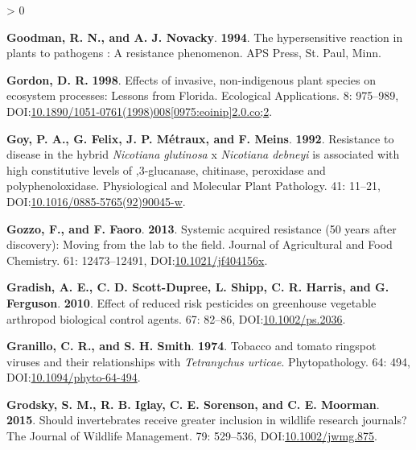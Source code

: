 \documentclass{ufdissertation}[overrideChapters] %
\newlength{\cslhangindent}
\newenvironment{CSLReferences}[2] %
 {%
  \setlength{\parindent}{0pt}
  \ifodd #1 \everypar{\setlength{\hangindent}{\cslhangindent}}\ignorespaces\fi
  \ifnum #2 > 0
  \setlength{\parskip}{#2\baselineskip}
  \fi
 }%
 {}
\begin{document}
{\begin{CSLReferences}{1}{1}
\leavevmode{}%
\textbf{Goodman, R. N., and A. J. Novacky}. \textbf{1994}. The hypersensitive reaction in plants to pathogens : A resistance phenomenon. APS Press, St. Paul, Minn.

\leavevmode{}%
\textbf{Gordon, D. R.} \textbf{1998}. Effects of invasive, non-indigenous plant species on ecosystem processes: Lessons from {Florida}. Ecological Applications. 8: 975--989, DOI:\href{https://doi.org/10.1890/1051-0761(1998)008\%5B0975:eoinip\%5D2.0.co;2}{10.1890/1051-0761(1998)008{[}0975:eoinip{]}2.0.co;2}.

\leavevmode{}%
\textbf{Goy, P. A., G. Felix, J. P. Métraux, and F. Meins}. \textbf{1992}. Resistance to disease in the hybrid {\emph{Nicotiana glutinosa}} x {\emph{Nicotiana debneyi}} is associated with high constitutive levels of ,3-glucanase, chitinase, peroxidase and polyphenoloxidase. Physiological and Molecular Plant Pathology. 41: 11--21, DOI:\href{https://doi.org/10.1016/0885-5765(92)90045-w}{10.1016/0885-5765(92)90045-w}.

\leavevmode{}%
\textbf{Gozzo, F., and F. Faoro}. \textbf{2013}. Systemic acquired resistance (50 years after discovery): Moving from the lab to the field. Journal of Agricultural and Food Chemistry. 61: 12473--12491, DOI:\href{https://doi.org/10.1021/jf404156x}{10.1021/jf404156x}.

\leavevmode{}%
\textbf{Gradish, A. E., C. D. Scott-Dupree, L. Shipp, C. R. Harris, and G. Ferguson}. \textbf{2010}. Effect of reduced risk pesticides on greenhouse vegetable arthropod biological control agents. 67: 82--86, DOI:\href{https://doi.org/10.1002/ps.2036}{10.1002/ps.2036}.

\leavevmode{}%
\textbf{Granillo, C. R., and S. H. Smith}. \textbf{1974}. Tobacco and tomato ringspot viruses and their relationships with {\emph{Tetranychus urticae}}. Phytopathology. 64: 494, DOI:\href{https://doi.org/10.1094/phyto-64-494}{10.1094/phyto-64-494}.

\leavevmode{}%
\textbf{Grodsky, S. M., R. B. Iglay, C. E. Sorenson, and C. E. Moorman}. \textbf{2015}. Should invertebrates receive greater inclusion in wildlife research journals? The Journal of Wildlife Management. 79: 529--536, DOI:\href{https://doi.org/10.1002/jwmg.875}{10.1002/jwmg.875}.


\end{CSLReferences}}
\end{document}
